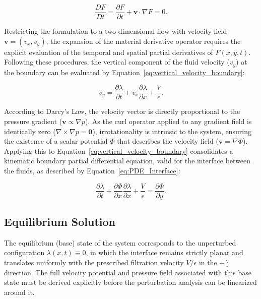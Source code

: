 \begin{equation}
\label{eq:material_derivative_F}
    \frac{D F}{D t} = \frac{\partial F}{\partial t} + \mathbf{v} \cdot \nabla F = 0.
\end{equation}

Restricting the formulation to a two-dimensional flow with velocity field $\mathbf{v} = (v_x, v_y)$, the expansion of the material derivative operator requires the explicit evaluation of the temporal and spatial partial derivatives of $F(x,y,t)$. Following these procedures, the vertical component of the fluid velocity ($v_y$) at the boundary can be evaluated by Equation~\ref{eq:vertical_velocity_boundary}:

\begin{equation}
\label{eq:vertical_velocity_boundary}
    v_y = \frac{\partial \lambda}{\partial t} + v_x \frac{\partial \lambda}{\partial x} + \frac{V}{\epsilon}.
\end{equation}

According to Darcy's Law, the velocity vector is directly proportional to the pressure gradient ($\mathbf{v} \propto \nabla p$). As the curl operator applied to any gradient field is identically zero ($\nabla \times \nabla p = \mathbf{0}$), irrotationality is intrinsic to the system, ensuring the existence of a scalar potential $\Phi$ that describes the velocity field ($\mathbf{v} = \nabla \Phi$). Applying this to Equation~\ref{eq:vertical_velocity_boundary} consolidates a kinematic boundary partial differential equation, valid for the interface between the fluids, as described by Equation~\ref{eq:PDE_Interface}:

\begin{equation}
\label{eq:PDE_Interface}
    \frac{\partial \lambda}{\partial t} + \frac{\partial \Phi}{\partial x} \frac{\partial \lambda}{\partial x} + \frac{V}{\epsilon} = \frac{\partial \Phi}{\partial y}.
\end{equation}

\subsection{Equilibrium Solution}

The equilibrium (base) state of the system corresponds to the unperturbed configuration $\lambda(x,t) \equiv 0$, in which the interface remains strictly planar and translates uniformly with the prescribed filtration velocity $V/\epsilon$ in the $+\hat{\jmath}$ direction. The full velocity potential and pressure field associated with this base state must be derived explicitly before the perturbation analysis can be linearized around it.

